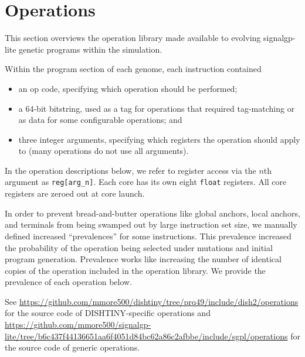 \section{Operations}

\newcommand{\opdef}[2]{
    \begin{tabular}{|
        >{\columncolor[HTML]{C0C0C0}}l |l|}
        \hline
        Prevalence & #1 \\ \hline
        Num Args   & #2 \\ \hline
    \end{tabular}
}

This section overviews the operation library made available to evolving signalgp-lite genetic programs within the simulation.

Within the program section of each genome, each instruction contained
\begin{itemize}
\item an op code, specifying which operation should be performed;
\item a 64-bit bitstring, used as a tag for operations that required tag-matching or as data for some configurable operations; and
\item three integer arguments, specifying which registers the operation should apply to (many operations do not use all arguments).
\end{itemize}

In the operation descriptions below, we refer to register access via the $n$th argument as \texttt{reg[arg\_n]}.
Each core has its own eight \texttt{float} registers.
All core registers are zeroed out at core launch.

In order to prevent bread-and-butter operations like global anchors, local anchors, and terminals from being swamped out by large instruction set size, we manually defined increased ``prevalences'' for some instructions.
This prevalence increased the probability of the operation being selected under mutations and initial program generation.
Prevalence works like increasing the number of identical copies of the operation included in the operation library.
We provide the prevalence of each operation below.

See \url{https://github.com/mmore500/dishtiny/tree/prq49/include/dish2/operations} for the source code of DISHTINY-specific operations and \url{https://github.com/mmore500/signalgp-lite/tree/b6c437f44136651aa6f4051d84bc62a86c2afbbe/include/sgpl/operations} for the source code of generic operations.

